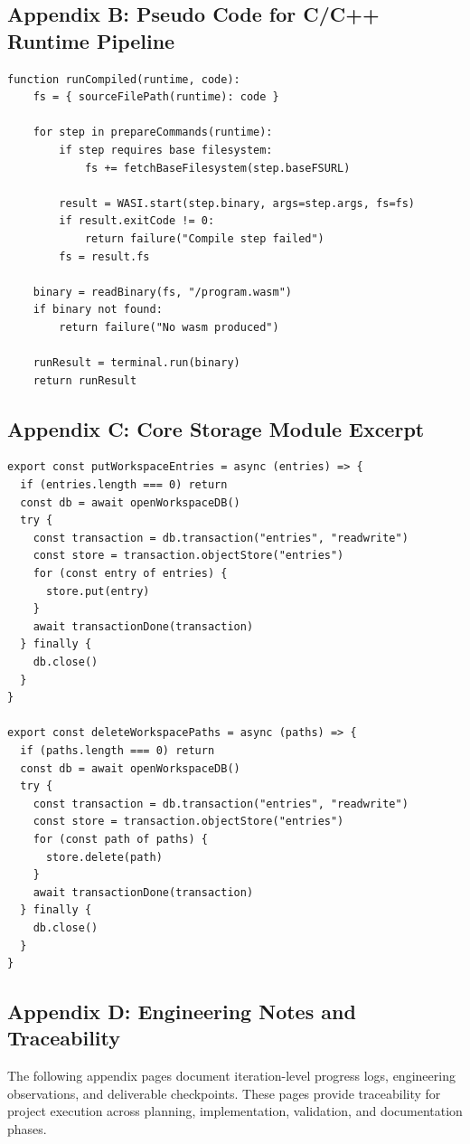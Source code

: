 \subsection*{Appendix B: Pseudo Code for C/C++ Runtime Pipeline}
\begin{lstlisting}[style=pystyle,caption={Pseudo Code -- Compiled Language Execution}]
function runCompiled(runtime, code):
    fs = { sourceFilePath(runtime): code }

    for step in prepareCommands(runtime):
        if step requires base filesystem:
            fs += fetchBaseFilesystem(step.baseFSURL)

        result = WASI.start(step.binary, args=step.args, fs=fs)
        if result.exitCode != 0:
            return failure("Compile step failed")
        fs = result.fs

    binary = readBinary(fs, "/program.wasm")
    if binary not found:
        return failure("No wasm produced")

    runResult = terminal.run(binary)
    return runResult
\end{lstlisting}

\subsection*{Appendix C: Core Storage Module Excerpt}
\begin{lstlisting}[style=javascriptstyle,caption={IndexedDB Operations Excerpt}]
export const putWorkspaceEntries = async (entries) => {
  if (entries.length === 0) return
  const db = await openWorkspaceDB()
  try {
    const transaction = db.transaction("entries", "readwrite")
    const store = transaction.objectStore("entries")
    for (const entry of entries) {
      store.put(entry)
    }
    await transactionDone(transaction)
  } finally {
    db.close()
  }
}

export const deleteWorkspacePaths = async (paths) => {
  if (paths.length === 0) return
  const db = await openWorkspaceDB()
  try {
    const transaction = db.transaction("entries", "readwrite")
    const store = transaction.objectStore("entries")
    for (const path of paths) {
      store.delete(path)
    }
    await transactionDone(transaction)
  } finally {
    db.close()
  }
}
\end{lstlisting}

\subsection*{Appendix D: Engineering Notes and Traceability}
The following appendix pages document iteration-level progress logs, engineering observations, and deliverable checkpoints. These pages provide traceability for project execution across planning, implementation, validation, and documentation phases.

